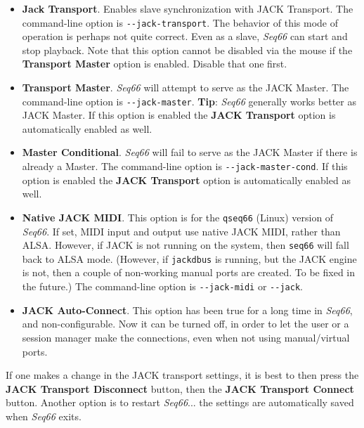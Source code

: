    \begin{itemize}
      \item \textbf{Jack Transport}.
         Enables slave synchronization with JACK Transport.
         The command-line option is \texttt{-{}-jack-transport}.
         The behavior of this mode of operation is perhaps not quite
         correct.  Even as a slave, \textsl{Seq66} can start and
         stop playback.
         Note that this option cannot be disabled via the mouse if the
         \textbf{Transport Master} option is enabled.  Disable that one first.
      \item \textbf{Transport Master}.
         \textsl{Seq66} will attempt to serve as the JACK Master.
         The command-line option is \texttt{-{}-jack-master}.
         \textbf{Tip}:
         \textsl{Seq66} generally works better as JACK Master.
         If this option is enabled the \textbf{JACK Transport} option is
         automatically enabled as well.
      \item \textbf{Master Conditional}.
         \textsl{Seq66} will fail to serve as the JACK Master if there is
         already a Master.
         The command-line option is \texttt{-{}-jack-master-cond}.
         If this option is enabled the \textbf{JACK Transport} option is
         automatically enabled as well.
      \item \textbf{Native JACK MIDI}.
         This option is for the \texttt{qseq66} (Linux) version of
         \textsl{Seq66}.
         If set, MIDI input and output use native JACK MIDI,
         rather than ALSA.  However, if JACK is not running on the
         system, then \texttt{seq66} will fall back to ALSA mode.
         (However, if \texttt{jackdbus} is running, but the JACK engine is not,
         then a couple of non-working manual ports are created.  To be fixed in
         the future.)
         The command-line option is \texttt{-{}-jack-midi}
         or \texttt{-{}-jack}.
      \item \textbf{JACK Auto-Connect}.
         This option has been true for a long time in \textsl{Seq66}, and
         non-configurable.  Now it can be turned off, in order to let the user
         or a session manager make the connections, even when not using
         manual/virtual ports.
   \end{itemize}

   If one makes a change in the JACK transport settings, it is best to
   then press the \textbf{JACK Transport Disconnect} button, then the
   \textbf{JACK Transport Connect} button.
   Another option is to restart
   \textsl{Seq66}... the settings are automatically saved when
   \textsl{Seq66} exits.

